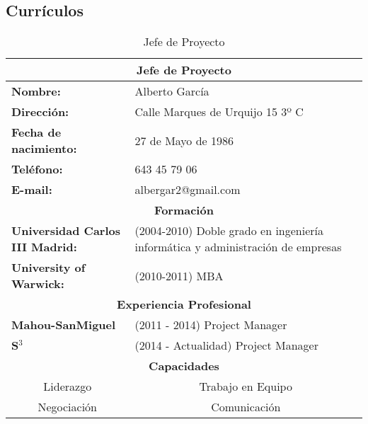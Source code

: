 \subsection{Currículos}

\begin{table}[!hb]
\begin{center}
\begin{tabular}{p{} p{9cm}}
\multicolumn{2}{c}{\Large{\textbf{Jefe de Proyecto}}} \\
\hline
\textbf{Nombre:} & Alberto García\\
\textbf{Dirección:} & Calle Marques de Urquijo 15 3º C\\
\textbf{Fecha de nacimiento:} & 27 de Mayo de 1986 \\
\textbf{Teléfono:} & 643 45 79 06\\
\textbf{E-mail:} & albergar2@gmail.com\\
\hline \hline
\multicolumn{2}{c}{\textbf{Formación} } \\
\hline
\textbf{Universidad Carlos III Madrid:} & (2004-2010) Doble grado en ingeniería informática y administración de empresas  \\
\textbf{University of Warwick:} & (2010-2011) MBA  \\
\hline \hline
\multicolumn{2}{c}{\textbf{Experiencia Profesional} } \\
\hline
\textbf{Mahou-SanMiguel} & (2011 - 2014) Project Manager\\
\textbf{S$^3$} & (2014 - Actualidad) Project Manager\\
\hline \hline
\multicolumn{2}{c}{\textbf{Capacidades} } \\
\hline
\multicolumn{1}{c}{Liderazgo} & \multicolumn{1}{c}{Trabajo en Equipo}\\
\multicolumn{1}{c}{Negociación} & \multicolumn{1}{c}{Comunicación} \\
\hline \hline
\end{tabular}
\caption{Jefe de Proyecto}
\label{tab:jefeDeProyecto}
\end{center}
\end{table}



